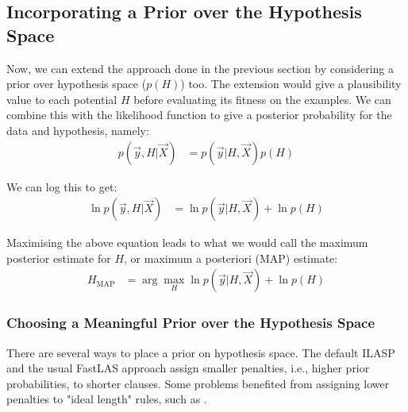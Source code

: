 \subsection{Incorporating a Prior over the Hypothesis Space}

Now, we can extend the approach done in the previous section by considering a prior over hypothesis space ($p(H)$) too.
The extension would give a plausibility value to each potential $H$ before evaluating its fitness on the examples. 
We can combine this with the likelihood function to give a posterior probability for the data and hypothesis, namely:
\begin{align}
p(\vec{y}, H|\vec{X})
& = p(\vec{y}|H, \vec{X})p(H)
\end{align}

We can log this to get:
\begin{align}
\ln p(\vec{y}, H|\vec{X})
& = \ln p(\vec{y}|H, \vec{X}) + \ln p(H)
\end{align}

Maximising the above equation leads to what we would call the maximum posterior estimate for $H$, or maximum a posteriori (MAP) estimate:
\begin{align}
H_{\text{MAP}}
& = \arg\max_{H} \ln p(\vec{y}|H, \vec{X}) + \ln p(H) 
\end{align}




\subsubsection{Choosing a Meaningful Prior over the Hypothesis Space}

There are several ways to place a prior on hypothesis space. 
The default ILASP \cite{RefWorks:RefID:18-law2020ilasp} and the usual FastLAS approach assign smaller penalties, i.e., higher prior probabilities, to shorter clauses.
Some problems benefited from assigning lower penalties to "ideal length" rules, such as  \cite{RefWorks:RefID:67-drozdov2021online}.

